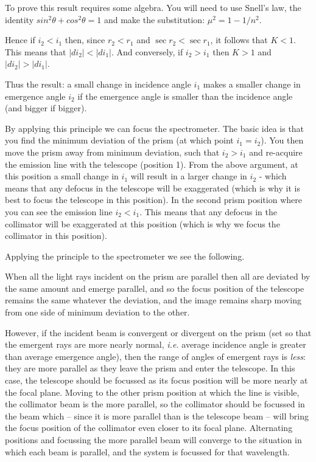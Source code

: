 \documentclass[12pt]{article}
\newcommand{\ie}{ {\em i.e. }}
\begin{document}
To prove this result requires some algebra. You will need to use
Snell's law, the identity $sin^2 \theta + cos^2\theta =1$ and make the
substitution: $\mu^2 =  1 - 1/n^2$.

Hence if $i_2<i_1$ then, since $r_2<r_1$ and $\sec r_2 <  \sec r_1$, it 
follows that $K<1$. This means that $|di_2|<|di_1|$. And conversely, if
$i_2>i_1$ then $K>1$ and $|di_2|>|di_1|$.


\vspace*{3mm}

{\large Thus the result:  a small change in incidence angle $i_1$ makes a 
smaller change in emergence angle $i_2$ if the emergence angle is 
smaller than the incidence angle (and bigger if bigger).}\\

\medskip

\noindent
By applying this principle we can focus the spectrometer. The basic
idea is that you find the minimum
deviation of the prism (at which point $i_1=i_2$). You then move the
prism away from minimum deviation, such that $i_2>i_1$ and re-acquire
the emission line with the telescope (position 1). From the above
argument, at this position a small change in $i_1$ will result in a larger
change in $i_2$ - which means that any defocus in the telescope will
be exaggerated (which is why it is best to focus the
telescope in this position). In the second prism position where you
can see the emission line $i_2<i_1$. This means that any defocus in
the collimator will be exaggerated at this position (which is why we
focus the collimator in this position).



\newpage

Applying the principle to
the spectrometer we see the following.

When all the light rays incident on the prism are parallel 
then all are deviated by the same amount and emerge parallel, and
so the focus position of the telescope remains the same whatever the
deviation, and the image remains sharp  moving from one side of
minimum deviation to the other. 

However, if the incident beam is convergent or divergent on the prism 
(set so that the emergent rays are  more nearly normal, \ie 
average incidence angle is greater than average emergence angle), then
the range of angles of emergent rays is {\sl less\/}: they are 
 more parallel as they leave the prism and enter the telescope.
In this case, the telescope should be focussed as its focus position will be
more nearly at the focal plane. Moving to the other prism 
position at
which the line is visible, the collimator beam is the more parallel,
so the collimator should be focussed in the beam which -- since it is more 
parallel than is the telescope beam -- will bring the focus position of the 
collimator even closer to its focal plane. Alternating positions and 
focussing the 
more parallel beam will converge to the situation in which each beam is 
parallel, and the system is focussed for that wavelength.
\end{document}
